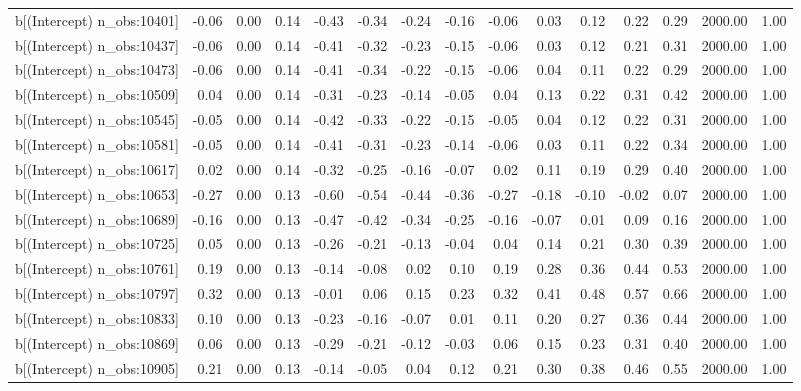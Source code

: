 \begin{table}[ht]
\begin{tabular}{rrrrrrrrrrrrrrr}
  b[(Intercept) n\_obs:10401] & -0.06 & 0.00 & 0.14 & -0.43 & -0.34 & -0.24 & -0.16 & -0.06 & 0.03 & 0.12 & 0.22 & 0.29 & 2000.00 & 1.00 \\ 
  b[(Intercept) n\_obs:10437] & -0.06 & 0.00 & 0.14 & -0.41 & -0.32 & -0.23 & -0.15 & -0.06 & 0.03 & 0.12 & 0.21 & 0.31 & 2000.00 & 1.00 \\ 
  b[(Intercept) n\_obs:10473] & -0.06 & 0.00 & 0.14 & -0.41 & -0.34 & -0.22 & -0.15 & -0.06 & 0.04 & 0.11 & 0.22 & 0.29 & 2000.00 & 1.00 \\ 
  b[(Intercept) n\_obs:10509] & 0.04 & 0.00 & 0.14 & -0.31 & -0.23 & -0.14 & -0.05 & 0.04 & 0.13 & 0.22 & 0.31 & 0.42 & 2000.00 & 1.00 \\ 
  b[(Intercept) n\_obs:10545] & -0.05 & 0.00 & 0.14 & -0.42 & -0.33 & -0.22 & -0.15 & -0.05 & 0.04 & 0.12 & 0.22 & 0.31 & 2000.00 & 1.00 \\ 
  b[(Intercept) n\_obs:10581] & -0.05 & 0.00 & 0.14 & -0.41 & -0.31 & -0.23 & -0.14 & -0.06 & 0.03 & 0.11 & 0.22 & 0.34 & 2000.00 & 1.00 \\ 
  b[(Intercept) n\_obs:10617] & 0.02 & 0.00 & 0.14 & -0.32 & -0.25 & -0.16 & -0.07 & 0.02 & 0.11 & 0.19 & 0.29 & 0.40 & 2000.00 & 1.00 \\ 
  b[(Intercept) n\_obs:10653] & -0.27 & 0.00 & 0.13 & -0.60 & -0.54 & -0.44 & -0.36 & -0.27 & -0.18 & -0.10 & -0.02 & 0.07 & 2000.00 & 1.00 \\ 
  b[(Intercept) n\_obs:10689] & -0.16 & 0.00 & 0.13 & -0.47 & -0.42 & -0.34 & -0.25 & -0.16 & -0.07 & 0.01 & 0.09 & 0.16 & 2000.00 & 1.00 \\ 
  b[(Intercept) n\_obs:10725] & 0.05 & 0.00 & 0.13 & -0.26 & -0.21 & -0.13 & -0.04 & 0.04 & 0.14 & 0.21 & 0.30 & 0.39 & 2000.00 & 1.00 \\ 
  b[(Intercept) n\_obs:10761] & 0.19 & 0.00 & 0.13 & -0.14 & -0.08 & 0.02 & 0.10 & 0.19 & 0.28 & 0.36 & 0.44 & 0.53 & 2000.00 & 1.00 \\ 
  b[(Intercept) n\_obs:10797] & 0.32 & 0.00 & 0.13 & -0.01 & 0.06 & 0.15 & 0.23 & 0.32 & 0.41 & 0.48 & 0.57 & 0.66 & 2000.00 & 1.00 \\ 
  b[(Intercept) n\_obs:10833] & 0.10 & 0.00 & 0.13 & -0.23 & -0.16 & -0.07 & 0.01 & 0.11 & 0.20 & 0.27 & 0.36 & 0.44 & 2000.00 & 1.00 \\ 
  b[(Intercept) n\_obs:10869] & 0.06 & 0.00 & 0.13 & -0.29 & -0.21 & -0.12 & -0.03 & 0.06 & 0.15 & 0.23 & 0.31 & 0.40 & 2000.00 & 1.00 \\ 
  b[(Intercept) n\_obs:10905] & 0.21 & 0.00 & 0.13 & -0.14 & -0.05 & 0.04 & 0.12 & 0.21 & 0.30 & 0.38 & 0.46 & 0.55 & 2000.00 & 1.00 \\ 

\end{tabular}
\end{table}
